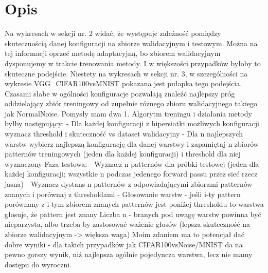 \documentclass{article}%
\begin{document}
%
\normalsize%
\section{Opis}%
\label{sec:Opis}%
Na wykresach w sekcji nr. 2 widać, że występuje zależność pomiędzy skutecznością danej konfiguracji na zbiorze walidacyjnym i testowym. \newline%
%
Można na tej informacji oprzeć metodę adaptacyjną, bo zbiorem walidacyjnym dysponujemy w trakcie trenowania metody. I w większości przypadków byłoby to skuteczne podejście.\newline%
%
Niestety na wykresach w sekcji nr. 3, w szczególności na wykresie VGG\_CIFAR100vsMNIST pokazana jest pułapka tego podejścia. \newline%
%
Czasami słabe w ogólności konfiguracje pozwalają znaleźć najlepszy próg oddzielający zbiór treningowy od zupełnie różnego zbioru walidacyjnego takiego jak NormalNoise. \newline%
%
Pomysły mam dwa \newline%
%
1. Algorytm treningu i działania metody byłby następujący:  \newline%
%
	 {-}  Dla każdej konfiguracji z hipersiatki możliwych konfiguracji wyznacz threshold i skuteczność vs dataset walidacyjny\newline%
%
	  {-} Dla n najlepszych warstw wybierz najlepszą konfigurację dla danej warstwy i zapamiętaj n zbiorów patternów treningowych (jeden dla każdej konfiguracji) i threshold dla niej wyznaczony\newline%
%
Faza testowa: \newline%
%
	  {-} Wyznacz n patternów dla próbki testowej (jeden dla każdej konfiguracji; wszystkie n podczas jedenego forward passu przez sieć rzecz jasna)\newline%
%
	  {-} Wyznacz dystans n patternów z odpowiadającymi zbiorami patternów znanych i porównaj z thresholdami\newline%
%
	  {-} Głosowanie warstw {-} jeśli i{-}ty pattern porównany z i{-}tym zbiorem znanych patternów jest poniżej thresholdu to warstwa głosuje, że pattern jest znany\newline%
%
\newpage%
Liczba n {-} branych pod uwagę warstw powinna być nieparzysta, albo trzeba by zastosować ważenie głosów (lepsza skuteczność na zbiorze walidacyjnym {-}> większa waga) \newline%
%
Moim zdaniem ma to potencjał dać dobre wyniki {-} dla takich przypadków jak CIFAR100vsNoise/MNIST da na pewno gorszy wynik, niż najlepsza ogólnie pojedyncza warstwa, lecz nie mamy dostępu do wyroczni.\newline%
\end{document}
